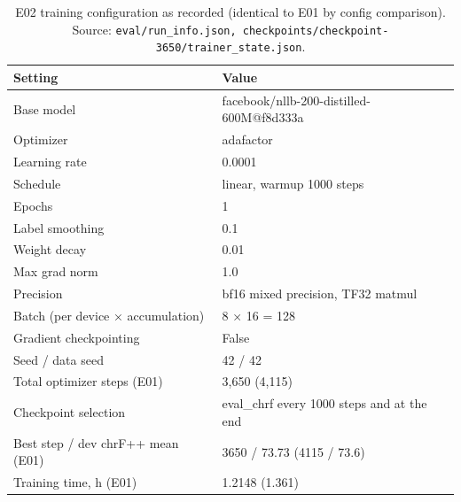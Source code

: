\begin{table}[t]
\centering
\small
\begin{tabular}{ll}
\toprule
Setting & Value \\
\midrule
Base model & facebook/nllb-200-distilled-600M@f8d333a \\
Optimizer & adafactor \\
Learning rate & 0.0001 \\
Schedule & linear, warmup 1000 steps \\
Epochs & 1 \\
Label smoothing & 0.1 \\
Weight decay & 0.01 \\
Max grad norm & 1.0 \\
Precision & bf16 mixed precision, TF32 matmul \\
Batch (per device × accumulation) & 8 × 16 = 128 \\
Gradient checkpointing & False \\
Seed / data seed & 42 / 42 \\
Total optimizer steps (E01) & 3,650 (4,115) \\
Checkpoint selection & eval\_chrf every 1000 steps and at the end \\
Best step / dev chrF++ mean (E01) & 3650 / 73.73 (4115 / 73.6) \\
Training time, h (E01) & 1.2148 (1.361) \\
\bottomrule
\end{tabular}
\caption{E02 training configuration as recorded (identical to E01 by config comparison). Source: \texttt{eval/run\_info.json, checkpoints/checkpoint-3650/trainer\_state.json}.}
\label{tab:e02-hyperparameters}
\end{table}
